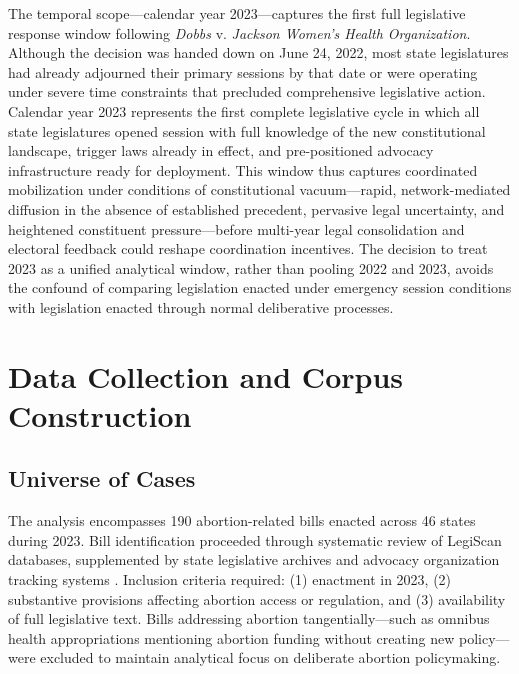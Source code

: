The temporal scope---calendar year 2023---captures the first full legislative response window following \emph{Dobbs} v. \emph{Jackson Women's Health Organization}. Although the decision was handed down on June 24, 2022, most state legislatures had already adjourned their primary sessions by that date or were operating under severe time constraints that precluded comprehensive legislative action. Calendar year 2023 represents the first complete legislative cycle in which all state legislatures opened session with full knowledge of the new constitutional landscape, trigger laws already in effect, and pre-positioned advocacy infrastructure ready for deployment. This window thus captures coordinated mobilization under conditions of constitutional vacuum---rapid, network-mediated diffusion in the absence of established precedent, pervasive legal uncertainty, and heightened constituent pressure---before multi-year legal consolidation and electoral feedback could reshape coordination incentives. The decision to treat 2023 as a unified analytical window, rather than pooling 2022 and 2023, avoids the confound of comparing legislation enacted under emergency session conditions with legislation enacted through normal deliberative processes.

\section{Data Collection and Corpus Construction}
\label{sec:corpus}
\subsection{Universe of Cases}
\label{sec:universe}
The analysis encompasses 190 abortion-related bills enacted across 46 states during 2023. Bill identification proceeded through systematic review of LegiScan databases, supplemented by state legislative archives and advocacy organization tracking systems \parencite{nash13StatesHave2022}. Inclusion criteria required: (1) enactment in 2023, (2) substantive provisions affecting abortion access or regulation, and (3) availability of full legislative text. Bills addressing abortion tangentially—such as omnibus health appropriations mentioning abortion funding without creating new policy—were excluded to maintain analytical focus on deliberate abortion policymaking.

